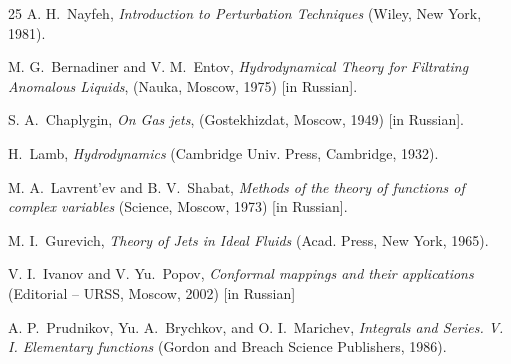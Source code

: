 \documentclass[
11pt,%
tightenlines,%
twoside,%
onecolumn,%
nofloats,%
nobibnotes,%
nofootinbib,%
superscriptaddress,%
noshowpacs,%
centertags]%
{revtex4-2}
\begin{document}
\begin{thebibliography}{25}
A. H.~Nayfeh, \textit{Introduction to Perturbation Techniques} (Wiley, New York, 1981).

M. G.~Bernadiner and V. M.~Entov, \textit{Hydrodynamical Theory for Filtrating Anomalous Liquids},
(Nauka, Moscow, 1975) [in Russian].

S. A.~Chaplygin, \textit{On Gas jets}, (Gostekhizdat, Moscow, 1949) [in Russian].

H.~Lamb, \textit{Hydrodynamics} (Cambridge Univ. Press, Cambridge, 1932).

M. A.~Lavrent'ev and  B. V.~Shabat, \textit{Methods of the theory of functions of complex
variables} (Science, Moscow, 1973) [in Russian].

M. I.~Gurevich, \textit{Theory of Jets in Ideal Fluids} (Acad. Press, New York, 1965).

V. I.~Ivanov and V. Yu.~Popov, \textit{Conformal mappings and their applications} (Editorial -- URSS,
Moscow, 2002) [in Russian]

A. P.~Prudnikov, Yu. A.~Brychkov, and O. I.~Marichev, \textit{Integrals and Series. V. I. Elementary
functions} (Gordon and Breach Science Publishers, 1986).


\end{thebibliography}
\end{document}
